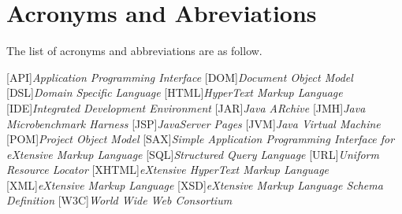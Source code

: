 \chapter*{Acronyms and Abreviations} \label{chap:acronyms}

The list of acronyms and abbreviations are as follow. \\

\begin{acronym}[Z] 

[API]{\emph{Application Programming Interface}}
[DOM]{\emph{Document Object Model}}
[DSL]{\emph{Domain Specific Language}}
[HTML]{\emph{HyperText Markup Language}}
[IDE]{\emph{Integrated Development Environment}}
[JAR]{\emph{Java ARchive}}
[JMH]{\emph{Java Microbenchmark Harness}}
[JSP]{\emph{JavaServer Pages}}
[JVM]{\emph{Java Virtual Machine}}
[POM]{\emph{Project Object Model}}
[SAX]{\emph{Simple Application Programming Interface for eXtensive Markup Language}}
[SQL]{\emph{Structured Query Language}}
[URL]{\emph{Uniform Resource Locator}}
[XHTML]{\emph{eXtensive HyperText Markup Language}}
[XML]{\emph{eXtensive Markup Language}}
[XSD]{\emph{eXtensive Markup Language Schema Definition}}
[W3C]{\emph{World Wide Web Consortium}}

\end{acronym}


